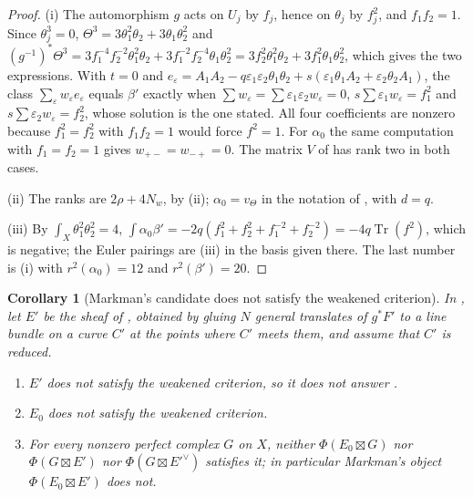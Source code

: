 \documentclass[11pt,reqno]{amsart}
\theoremstyle{plain}
\newtheorem{corollary}[theorem]{Corollary}
\theoremstyle{definition}
\theoremstyle{remark}
\DeclareMathOperator{\Tr}{Tr}
\begin{document}
\begin{proof}
(i) The automorphism $g$ acts on $U_{j}$ by $f_{j}$, hence on $\theta_{j}$ by
$f_{j}^{2}$, and $f_{1}f_{2}=1$. Since $\theta_{j}^{3}=0$,
$\Theta^{3}=3\theta_{1}^{2}\theta_{2}+3\theta_{1}\theta_{2}^{2}$ and
$(g^{-1})^{*}\Theta^{3}=3f_{1}^{-4}f_{2}^{-2}\theta_{1}^{2}\theta_{2}
+3f_{1}^{-2}f_{2}^{-4}\theta_{1}\theta_{2}^{2}
=3f_{2}^{2}\theta_{1}^{2}\theta_{2}+3f_{1}^{2}\theta_{1}\theta_{2}^{2}$, which
gives the two expressions. With $t=0$ and
$e_{\varepsilon}=A_{1}A_{2}-q\varepsilon_{1}\varepsilon_{2}\theta_{1}\theta_{2}
+s(\varepsilon_{1}\theta_{1}A_{2}+\varepsilon_{2}\theta_{2}A_{1})$, the class
$\sum_{\varepsilon}w_{\varepsilon}e_{\varepsilon}$ equals $\beta'$ exactly when
$\sum w_{\varepsilon}=\sum\varepsilon_{1}\varepsilon_{2}w_{\varepsilon}=0$,
$s\sum\varepsilon_{1}w_{\varepsilon}=f_{1}^{2}$ and
$s\sum\varepsilon_{2}w_{\varepsilon}=f_{2}^{2}$, whose solution is the one
stated. All four coefficients are nonzero because $f_{1}^{2}=f_{2}^{2}$ with
$f_{1}f_{2}=1$ would force $f^{2}=1$. For $\alpha_{0}$ the same computation
with $f_{1}=f_{2}=1$ gives $w_{+-}=w_{-+}=0$. The matrix $V$ of
 has rank two in both cases.

(ii) The ranks are $2\rho+4N_{w}$, by (ii);
$\alpha_{0}=v_{\Theta}$ in the notation of \cite[(30)]{paperI}, with $d=q$.

(iii) By $\int_{X}\theta_{1}^{2}\theta_{2}^{2}=4$,
$\int\alpha_{0}\beta'=-2q(f_{1}^{2}+f_{2}^{2}+f_{1}^{-2}+f_{2}^{-2})=-4q\Tr(f^{2})$,
which is negative; the Euler pairings are
(iii) in the basis given there. The last number is
(i) with $r^{2}(\alpha_{0})=12$ and
$r^{2}(\beta')=20$.
\end{proof}

\begin{corollary}[Markman's candidate does not satisfy the weakened
criterion]\label{cor:markmanquarticfails}
In , let $E'$ be the sheaf of
\cite[Example~11.2.7]{Mar25c}, obtained by gluing $N$ general translates of
$g^{*}F'$ to a line bundle on a curve $C'$ at the points where $C'$ meets
them, and assume that $C'$ is reduced.
\begin{enumerate}[label=\textup{(\roman*)},leftmargin=2.6em,itemsep=2pt]
\item $E'$ does not satisfy the weakened criterion, so it does not answer
  \cite[Question~11.2.2]{Mar25c}.
\item $E_{0}$ does not satisfy the weakened criterion.
\item For every nonzero perfect complex $G$ on $X$, neither
  $\Phi(E_{0}\boxtimes G)$ nor $\Phi(G\boxtimes E')$ nor
  $\Phi(G\boxtimes E'^{\vee})$ satisfies it; in particular Markman's object
  $\Phi(E_{0}\boxtimes E')$ does not.
\end{enumerate}
\end{corollary}
\end{document}
